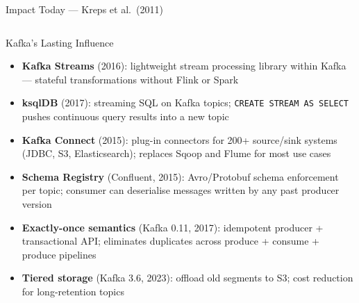 \documentclass[aspectratio=169,10pt]{beamer}
\begin{document}
\begin{frame}{Impact Today — Kreps et al.\ (2011)}
  \begin{columns}[T]
      \begin{block}{Kafka's Lasting Influence}
        \begin{itemize}
          \item \textbf{Kafka Streams} (2016): lightweight stream
                processing library within Kafka — stateful
                transformations without Flink or Spark
          \item \textbf{ksqlDB} (2017): streaming SQL on Kafka topics;
                \texttt{CREATE STREAM AS SELECT} pushes continuous
                query results into a new topic
          \item \textbf{Kafka Connect} (2015): plug-in connectors for
                200+ source/sink systems (JDBC, S3, Elasticsearch);
                replaces Sqoop and Flume for most use cases
          \item \textbf{Schema Registry} (Confluent, 2015): Avro/Protobuf
                schema enforcement per topic; consumer can deserialise
                messages written by any past producer version
          \item \textbf{Exactly-once semantics} (Kafka 0.11, 2017):
                idempotent producer + transactional API; eliminates
                duplicates across produce + consume + produce pipelines
          \item \textbf{Tiered storage} (Kafka 3.6, 2023):
                offload old segments to S3; cost reduction for
                long-retention topics
        \end{itemize}
      \end{block}


\end{columns}
\end{frame}
\end{document}
